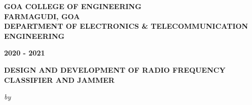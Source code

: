 \begin{center}
%
\bfseries{GOA COLLEGE OF ENGINEERING\\FARMAGUDI, GOA}\\
\bfseries{DEPARTMENT OF ELECTRONICS \& TELECOMMUNICATION ENGINEERING}\\
\begin{large}
\bfseries{2020 - 2021}\\
\end{large}
\vspace{0.5cm}
\begin{figure}[H]
{\centering {}\par}
\end{figure}
\vspace{-1.3cm}
\vspace{0.5cm}
\begin{large}
{\bfseries DESIGN AND DEVELOPMENT OF RADIO FREQUENCY CLASSIFIER AND JAMMER}\\
\end{large}
\vspace{0.3cm}
\begin{small}
\emph{by}\\
\end{small}
\vspace{0.4cm}

\end{center}
